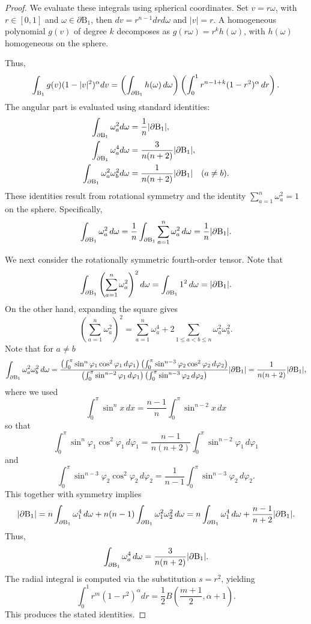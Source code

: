 \documentclass[10pt,reqno]{amsart}
\numberwithin{equation}{section}
\newcommand{\lt}{\left}
\newcommand{\rt}{\right}
\newcommand{\pa}{\partial}
\begin{document}
\begin{proof}
We evaluate these integrals using spherical coordinates. Set $v = r\omega$, with $r \in [0,1]$ and $\omega \in \partial \mathrm{B}_1$, then $dv = r^{n-1} dr d\omega$ and $|v| = r$. A homogeneous polynomial $g(v)$ of degree $k$ decomposes as $g(r\omega) = r^k h(\omega)$, with $h(\omega)$ homogeneous on the sphere.

Thus,
$$
\int_{{\rm B}_1} g(v)(1 - |v|^2)^\alpha dv = \lt(\int_{\pa {\rm B}_1} h(\omega) \,d\omega\rt) \lt(\int_0^1 r^{n - 1 + k} (1 - r^2)^\alpha \,dr\rt).
$$
The angular part is evaluated using standard identities:
\begin{align*}
\int_{\pa {\rm B}_1} \omega_a^2 d\omega &= \frac{1}{n} |\pa {\rm B}_1|,  \\
\int_{\pa {\rm B}_1} \omega_a^4 d\omega &= \frac{3}{n(n+2)} |\pa {\rm B}_1|, \\
\int_{\pa {\rm B}_1} \omega_a^2 \omega_b^2 d\omega &= \frac{1}{n(n+2)} |\pa {\rm B}_1| \quad (a \ne b).
\end{align*}
These identities result from rotational symmetry and the identity $\sum_{a=1}^n \omega_a^2 = 1$ on the sphere. Specifically,
\[
\int_{\pa {\rm B}_1} \omega_a^2 \, d\omega = \frac{1}{n} \int_{\pa {\rm B}_1} \sum_{a=1}^n \omega_a^2 \, d\omega = \frac{1}{n} |\pa {\rm B}_1|.
\]

We next consider the rotationally symmetric fourth-order tensor.  Note that 
\[
\int_{\pa {\rm B}_1} \left( \sum_{a=1}^n \omega_a^2 \right)^2 d\omega = \int_{\pa {\rm B}_1} 1^2\, d\omega = |\pa {\rm B}_1|.
\]
On the other hand, expanding the square gives
\[
 \left( \sum_{a=1}^n \omega_a^2 \right)^2 = \sum_{a=1}^n \omega_a^4 + 2 \sum_{1 \le a < b \le n} \omega_a^2 \omega_b^2.
\]
Note that for $a \neq b$
\[
   \int_{\pa {\rm B}_1}\omega_a^2 \omega_b^2\,d\omega =   \frac{ \lt( \int_0^\pi \sin^n\varphi_1\cos^2\varphi_1\,d\varphi_1\rt) \lt(\int_0^\pi \sin^{n-3}\varphi_2\cos^2\varphi_2\,d\varphi_2\rt)}{ \lt(\int_0^\pi \sin^{n-2}\varphi_1\,d\varphi_1\rt) \lt(\int_0^\pi \sin^{n-3}\varphi_2\,d\varphi_2\rt)}|\pa {\rm B}_1| = \frac{1}{n(n+2)}|\pa {\rm B}_1|,
\]
where we used
\[
\int_0^\pi \sin^n x\,dx=\frac{n-1}{n}\int_0^\pi\sin^{n-2}x\,dx
\]
so that
\[
\int_0^\pi \sin^n\varphi_1\cos^2\varphi_1\,d\varphi_1=\frac{n-1}{n(n+2)}\int_0^\pi \sin^{n-2}\varphi_1\,d\varphi_1
\]
and
\[ 
\int_0^\pi \sin^{n-3}\varphi_2\cos^2\varphi_2\,d\varphi_2=\frac{1}{n-1}\int_0^\pi \sin^{n-3}\varphi_2\,d\varphi_2.
\]
This together with symmetry implies
\[
|\pa {\rm B}_1| = n \int_{\pa {\rm B}_1} \omega_1^4 \, d\omega  + n(n - 1) \int_{\pa {\rm B}_1} \omega_1^2 \omega_2^2 \, d\omega = n \int_{\pa {\rm B}_1} \omega_1^4 \, d\omega + \frac{n-1}{n+2}|\pa {\rm B}_1|.
\]
Thus,
\[
\int_{\pa {\rm B}_1} \omega_a^4 \, d\omega = \frac{3}{n(n+2)} |\pa {\rm B}_1|.
\]
The radial integral is computed via the substitution $s = r^2$, yielding
$$
\int_0^1 r^{m} (1 - r^2)^\alpha dr = \frac{1}{2} B\left(\frac{m+1}{2}, \alpha + 1\right).
$$
This produces the stated identities.
\end{proof}
\end{document}
